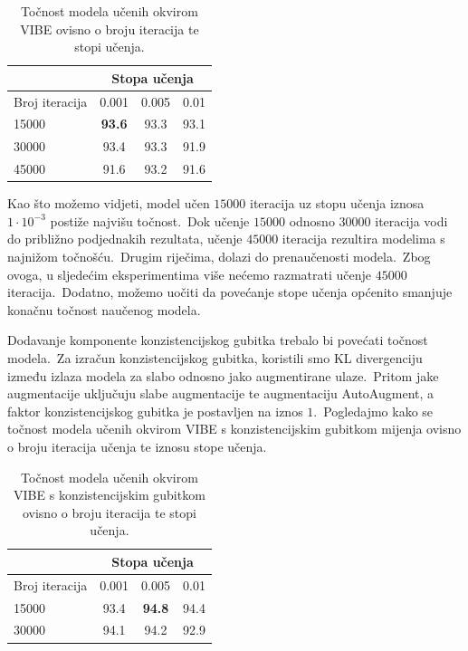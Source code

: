 \documentclass[diplomskirad]{fer}
\begin{document}
\begin{table}[htb]
  \caption{Točnost modela učenih okvirom VIBE ovisno o broju iteracija te stopi učenja.}
  \label{tbl:usporedba_lr_num_iter}
  \centering
  \begin{tabular}{l||ccc}
  & \multicolumn{3}{c}{Stopa učenja} \\ \hline
  Broj iteracija & 0.001 & 0.005 & 0.01 \\ \hline \hline
  15000 & \textbf{93.6} & 93.3 & 93.1 \\
  30000 & 93.4 & 93.3 & 91.9 \\ 
  45000 & 91.6 & 93.2 & 91.6 \\
  \end{tabular}
\end{table}

Kao što možemo vidjeti, model učen $15000$ iteracija uz stopu učenja iznosa $1 \cdot 10^{-3}$ postiže najvišu točnost.\ 
Dok učenje $15000$ odnosno $30000$ iteracija vodi do približno podjednakih rezultata, učenje $45000$ iteracija rezultira modelima s najnižom točnošću.\ 
Drugim riječima, dolazi do prenaučenosti modela.\ Zbog ovoga, u sljedećim eksperimentima više nećemo razmatrati učenje $45000$ iteracija.\ 
Dodatno, možemo uočiti da povećanje stope učenja općenito smanjuje konačnu točnost naučenog modela.\ 

\pagebreak

Dodavanje komponente konzistencijskog gubitka trebalo bi povećati točnost modela.\ Za izračun konzistencijskog gubitka, koristili smo KL divergenciju između izlaza modela za slabo odnosno jako augmentirane ulaze.\ 
Pritom jake augmentacije uključuju slabe augmentacije te augmentaciju AutoAugment, a faktor konzistencijskog gubitka je postavljen na iznos $1$.\ Pogledajmo kako se točnost modela učenih okvirom VIBE s konzistencijskim gubitkom mijenja ovisno o broju iteracija učenja te iznosu stope učenja.\ 

\begin{table}[htb]
  \caption{Točnost modela učenih okvirom VIBE s konzistencijskim gubitkom ovisno o broju iteracija te stopi učenja.}
  \label{tbl:usporedba_lr_num_iter_con_loss}
  \centering
  \begin{tabular}{l||ccc}
  & \multicolumn{3}{c}{Stopa učenja} \\ \hline
  Broj iteracija & 0.001 & 0.005 & 0.01 \\ \hline \hline
  15000 & 93.4 & \textbf{94.8} & 94.4 \\
  30000 & 94.1 & 94.2 & 92.9 \\ 
  \end{tabular}
\end{table}
\end{document}
